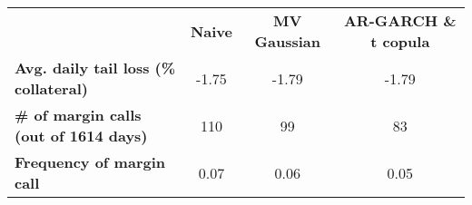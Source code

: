 \begin{small}\begin{tabular}{ l c c c }
&\textbf{Naive}&\textbf{MV Gaussian}&\textbf{AR-GARCH \& t copula}\\
\textbf{Avg. daily tail loss (\% collateral)}&-1.75&-1.79&-1.79\\
\textbf{\# of margin calls (out of 1614 days)}&110&99&83\\
\textbf{Frequency of margin call}&0.07&0.06&0.05\\
\end{tabular}
\end{small}
